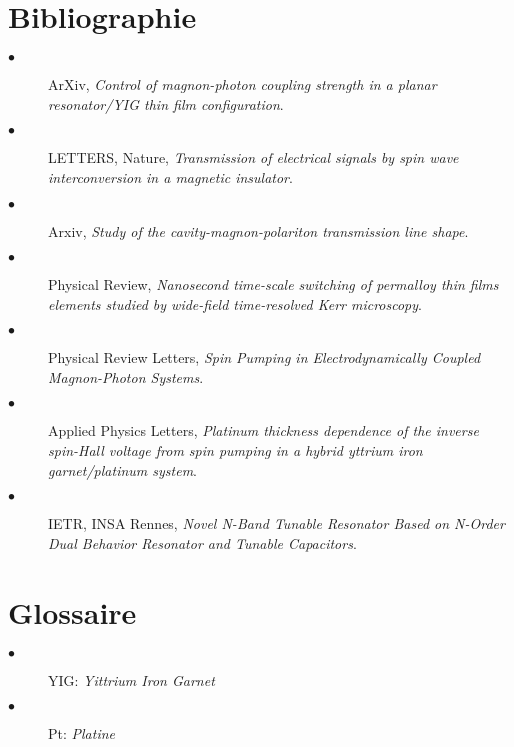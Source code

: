 \documentclass[12pt,fleqn]{book} %
\begin{document}
\part{Bibliographie}
\label{Sources}
\appendix
\begin{description}
 \item[$\bullet$] ArXiv, \emph{Control of magnon-photon coupling strength in a planar resonator/YIG thin film configuration}.
 \item[$\bullet$] LETTERS, Nature, \emph{Transmission of electrical signals by spin wave interconversion in a magnetic insulator}.
 \item[$\bullet$] Arxiv, \emph{Study of the cavity-magnon-polariton transmission line shape}.
 \item[$\bullet$] Physical Review, \emph{Nanosecond time-scale switching of permalloy thin films elements studied by wide-field time-resolved Kerr microscopy}.
 \item[$\bullet$] Physical Review Letters, \emph{Spin Pumping in Electrodynamically Coupled Magnon-Photon Systems}.
 \item[$\bullet$] Applied Physics Letters, \emph{Platinum thickness dependence of the inverse spin-Hall voltage from spin pumping in a hybrid yttrium iron garnet/platinum system}.
 \item[$\bullet$] IETR, INSA Rennes, \emph{Novel N-Band Tunable Resonator Based on N-Order Dual Behavior Resonator and Tunable Capacitors}.
\end{description}

\setcounter{part}{-6}
\part{Glossaire}
\begin{description}
 \item[$\bullet$] YIG: \emph{Yittrium Iron Garnet}
 \item[$\bullet$] Pt: \emph{Platine}
\end{description}
\end{document}
